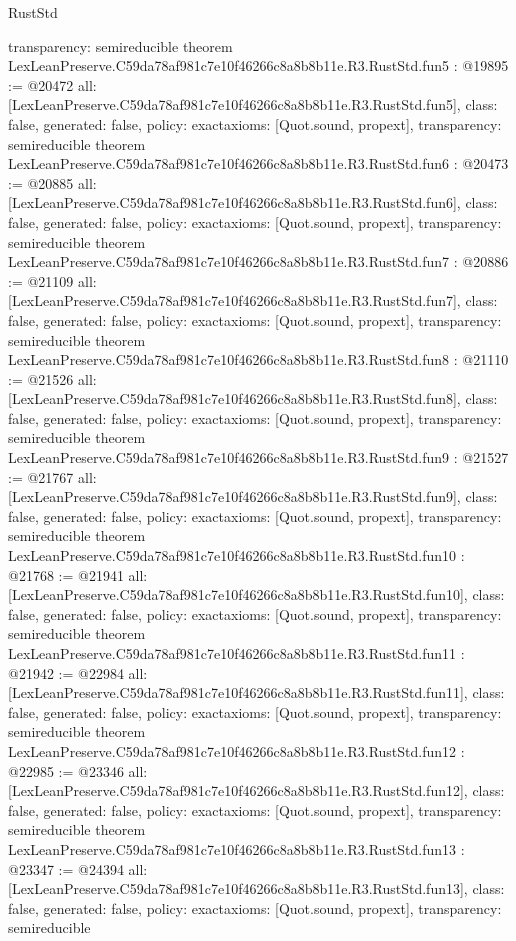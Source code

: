 \begin{lexlean}{RustStd}
\begin{coremodule}
{  transparency: semireducible
}
theorem LexLeanPreserve.C59da78af981c7e10f46266c8a8b8b11e.R3.RustStd.fun5 : @19895 := @20472 {
  all: [LexLeanPreserve.C59da78af981c7e10f46266c8a8b8b11e.R3.RustStd.fun5],
  class: false,
  generated: false,
  policy: exact{axioms: [Quot.sound, propext]},
  transparency: semireducible
}
theorem LexLeanPreserve.C59da78af981c7e10f46266c8a8b8b11e.R3.RustStd.fun6 : @20473 := @20885 {
  all: [LexLeanPreserve.C59da78af981c7e10f46266c8a8b8b11e.R3.RustStd.fun6],
  class: false,
  generated: false,
  policy: exact{axioms: [Quot.sound, propext]},
  transparency: semireducible
}
theorem LexLeanPreserve.C59da78af981c7e10f46266c8a8b8b11e.R3.RustStd.fun7 : @20886 := @21109 {
  all: [LexLeanPreserve.C59da78af981c7e10f46266c8a8b8b11e.R3.RustStd.fun7],
  class: false,
  generated: false,
  policy: exact{axioms: [Quot.sound, propext]},
  transparency: semireducible
}
theorem LexLeanPreserve.C59da78af981c7e10f46266c8a8b8b11e.R3.RustStd.fun8 : @21110 := @21526 {
  all: [LexLeanPreserve.C59da78af981c7e10f46266c8a8b8b11e.R3.RustStd.fun8],
  class: false,
  generated: false,
  policy: exact{axioms: [Quot.sound, propext]},
  transparency: semireducible
}
theorem LexLeanPreserve.C59da78af981c7e10f46266c8a8b8b11e.R3.RustStd.fun9 : @21527 := @21767 {
  all: [LexLeanPreserve.C59da78af981c7e10f46266c8a8b8b11e.R3.RustStd.fun9],
  class: false,
  generated: false,
  policy: exact{axioms: [Quot.sound, propext]},
  transparency: semireducible
}
theorem LexLeanPreserve.C59da78af981c7e10f46266c8a8b8b11e.R3.RustStd.fun10 : @21768 := @21941 {
  all: [LexLeanPreserve.C59da78af981c7e10f46266c8a8b8b11e.R3.RustStd.fun10],
  class: false,
  generated: false,
  policy: exact{axioms: [Quot.sound, propext]},
  transparency: semireducible
}
theorem LexLeanPreserve.C59da78af981c7e10f46266c8a8b8b11e.R3.RustStd.fun11 : @21942 := @22984 {
  all: [LexLeanPreserve.C59da78af981c7e10f46266c8a8b8b11e.R3.RustStd.fun11],
  class: false,
  generated: false,
  policy: exact{axioms: [Quot.sound, propext]},
  transparency: semireducible
}
theorem LexLeanPreserve.C59da78af981c7e10f46266c8a8b8b11e.R3.RustStd.fun12 : @22985 := @23346 {
  all: [LexLeanPreserve.C59da78af981c7e10f46266c8a8b8b11e.R3.RustStd.fun12],
  class: false,
  generated: false,
  policy: exact{axioms: [Quot.sound, propext]},
  transparency: semireducible
}
theorem LexLeanPreserve.C59da78af981c7e10f46266c8a8b8b11e.R3.RustStd.fun13 : @23347 := @24394 {
  all: [LexLeanPreserve.C59da78af981c7e10f46266c8a8b8b11e.R3.RustStd.fun13],
  class: false,
  generated: false,
  policy: exact{axioms: [Quot.sound, propext]},
  transparency: semireducible
}
\end{coremodule}
\end{lexlean}
